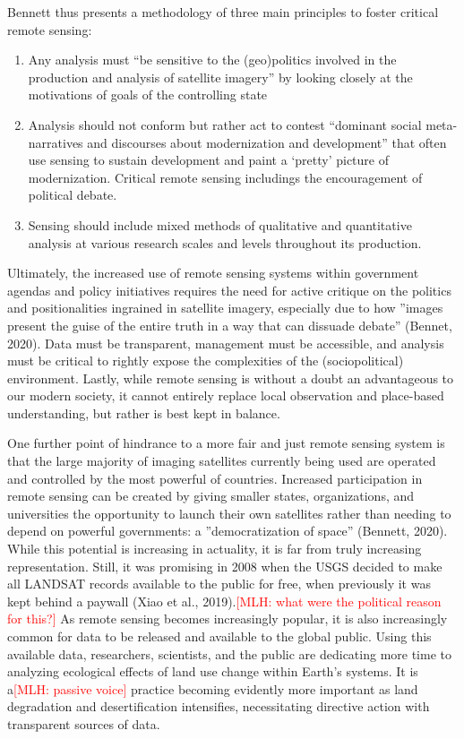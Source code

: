 \documentclass{book}\usepackage{knitr}
\newcommand{\red}[1]{\textcolor{red}{[MLH: #1]}}
\begin{document}
Bennett thus presents a methodology of three main principles to foster critical remote sensing:
\begin{enumerate}
\item Any analysis must ``be sensitive to the (geo)politics involved in the production and analysis of satellite imagery'' by looking closely at the motivations of goals of the controlling state
\item Analysis should not conform but rather act to contest ``dominant social meta-narratives and discourses about modernization and development'' that often use sensing to sustain development and paint a `pretty' picture of modernization. Critical remote sensing includings the encouragement of political debate.
\item Sensing should include mixed methods of qualitative and quantitative analysis at various research scales and levels throughout its production.
\end{enumerate}

Ultimately, the increased use of remote sensing systems within government agendas and policy initiatives requires the need for active critique on the politics and positionalities ingrained in satellite imagery, especially due to how ''images present the guise of the entire truth in a way that can dissuade debate'' (Bennet, 2020). Data must be transparent, management must be accessible, and analysis must be critical to rightly expose the complexities of the (sociopolitical) environment. Lastly, while remote sensing is without a doubt an advantageous to our modern society, it cannot entirely replace local observation and place-based understanding, but rather is best kept in balance.

One further point of hindrance to a more fair and just remote sensing system is that the large majority of imaging satellites currently being used are operated and controlled by the most powerful of countries. Increased participation in remote sensing can be created by giving smaller states, organizations, and universities the opportunity to launch their own satellites rather than needing to depend on powerful governments: a ''democratization of space'' (Bennett, 2020). While this potential is increasing in actuality, it is far from truly increasing representation. Still, it was promising in 2008 when the USGS decided to make all LANDSAT records available to the public for free, when previously it was kept behind a paywall (Xiao et al., 2019).\red{what were the political reason for this?} As remote sensing becomes increasingly popular, it is also increasingly common for data to be released and available to the global public. Using this available data, researchers, scientists, and the public are dedicating more time to analyzing ecological effects of land use change within Earth's systems. It is a\red{passive voice} practice becoming evidently more important as land degradation and desertification intensifies, necessitating directive action with transparent sources of data.
\end{document}
